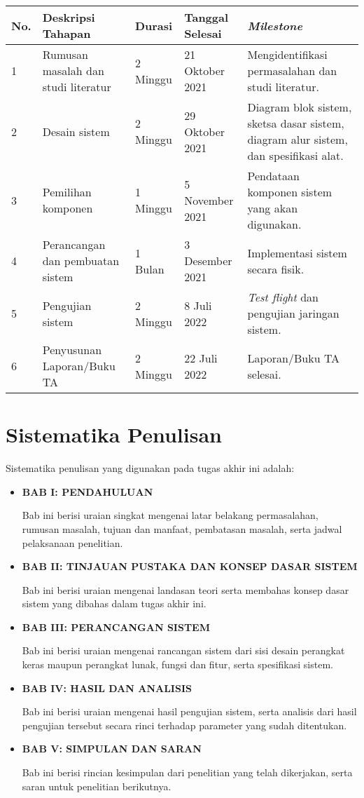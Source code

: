 \begin{center}
	\begin{tabular}{|p{1cm}|p{4cm}|p{2cm}|p{2cm}|p{4cm}|}
		\hline
		\textbf{No.} & \textbf{Deskripsi Tahapan} & \textbf{Durasi} & \textbf{Tanggal Selesai} & \textbf{\textit{Milestone}} \\
		\hline
		1 & Rumusan masalah dan studi literatur & 2 Minggu & 21 Oktober 2021 & Mengidentifikasi permasalahan dan studi literatur. \\
		\hline
		2 & Desain sistem & 2 Minggu & 29 Oktober 2021 & Diagram blok sistem, sketsa dasar sistem, diagram alur sistem, dan spesifikasi alat. \\
		\hline
		3 & Pemilihan komponen & 1 Minggu & 5 November 2021 & Pendataan komponen sistem yang akan digunakan. \\
		\hline
		4 & Perancangan dan pembuatan sistem & 1 Bulan & 3 Desember 2021 & Implementasi sistem secara fisik. \\
		\hline
		5 & Pengujian sistem & 2 Minggu & 8 Juli 2022 & \textit{Test flight} dan pengujian jaringan sistem. \\
		\hline
		6 & Penyusunan Laporan/Buku TA & 2 Minggu & 22 Juli 2022 & Laporan/Buku TA selesai. \\
		\hline
	\end{tabular}
\end{center}

\section{Sistematika Penulisan}
Sistematika penulisan yang digunakan pada tugas akhir ini adalah:
\begin{itemize}
	\item[] \textbf{BAB I: PENDAHULUAN}
	
	Bab ini berisi uraian singkat mengenai latar belakang permasalahan, rumusan masalah, tujuan dan manfaat, pembatasan masalah, serta jadwal pelaksanaan penelitian.
	
	\item[] \textbf{BAB II: TINJAUAN PUSTAKA DAN KONSEP DASAR SISTEM}
	
	Bab ini berisi uraian mengenai landasan teori serta membahas konsep dasar sistem yang dibahas dalam tugas akhir ini.
	
	\item[] \textbf{BAB III: PERANCANGAN SISTEM}
	
	Bab ini berisi uraian mengenai rancangan sistem dari sisi desain perangkat keras maupun perangkat lunak, fungsi dan fitur, serta spesifikasi sistem.
	
	\item[] \textbf{BAB IV: HASIL DAN ANALISIS}
	
	Bab ini berisi uraian mengenai hasil pengujian sistem, serta analisis dari hasil pengujian tersebut secara rinci terhadap parameter yang sudah ditentukan.
	
	\item[] \textbf{BAB V: SIMPULAN DAN SARAN}
	
	Bab ini berisi rincian kesimpulan dari penelitian yang telah dikerjakan, serta saran untuk penelitian berikutnya.
\end{itemize}	